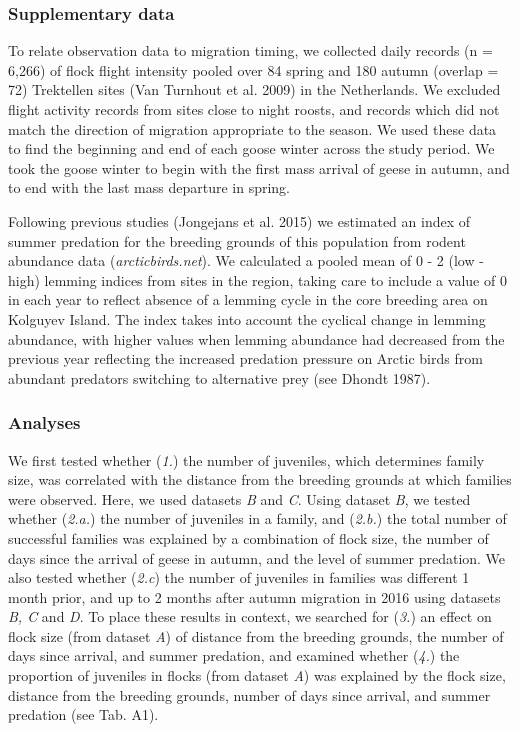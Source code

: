 \documentclass[10pt,twocolumn]{paper}
\begin{document}
\subsubsection{Supplementary data}\label{supplementary-data}

To relate observation data to migration timing, we collected daily
records (n = 6,266) of flock flight intensity pooled over 84 spring and
180 autumn (overlap = 72) Trektellen sites (Van Turnhout et al. 2009) in
the Netherlands. We excluded flight activity records from sites close to
night roosts, and records which did not match the direction of migration
appropriate to the season. We used these data to find the beginning and
end of each goose winter across the study period. We took the goose
winter to begin with the first mass arrival of geese in autumn, and to
end with the last mass departure in spring.

Following previous studies (Jongejans et al. 2015) we estimated an index
of summer predation for the breeding grounds of this population from
rodent abundance data (\emph{arcticbirds.net}). We calculated a pooled
mean of 0 - 2 (low - high) lemming indices from sites in the region,
taking care to include a value of 0 in each year to reflect absence of a
lemming cycle in the core breeding area on Kolguyev Island. The index
takes into account the cyclical change in lemming abundance, with higher
values when lemming abundance had decreased from the previous year
reflecting the increased predation pressure on Arctic birds from
abundant predators switching to alternative prey (see Dhondt 1987).

\subsubsection{Analyses}\label{analyses}

We first tested whether (\emph{1.}) the number of juveniles, which
determines family size, was correlated with the distance from the
breeding grounds at which families were observed. Here, we used datasets
\emph{B} and \emph{C}. Using dataset \emph{B}, we tested whether
(\emph{2.a.}) the number of juveniles in a family, and (\emph{2.b.}) the
total number of successful families was explained by a combination of
flock size, the number of days since the arrival of geese in autumn, and
the level of summer predation. We also tested whether (\emph{2.c}) the
number of juveniles in families was different 1 month prior, and up to 2
months after autumn migration in 2016 using datasets \emph{B, C} and
\emph{D}. To place these results in context, we searched for (\emph{3.})
an effect on flock size (from dataset \emph{A}) of distance from the
breeding grounds, the number of days since arrival, and summer
predation, and examined whether (\emph{4.}) the proportion of juveniles
in flocks (from dataset \emph{A}) was explained by the flock size,
distance from the breeding grounds, number of days since arrival, and
summer predation (see Tab. A1).
\end{document}
